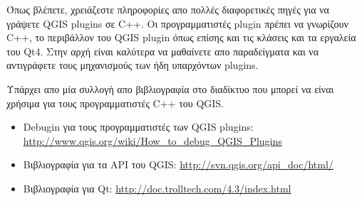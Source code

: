 Όπως βλέπετε, χρειάζεστε πληροφορίες απο πολλές διαφορετικές πηγές για να γράψετε QGIS plugins σε C++.  Οι προγραμματιστές plugin πρέπει να γνωρίζουν C++, το περιβάλλον του QGIS plugin όπως επίσης και τις κλάσεις και τα εργαλεία του Qt4. Στην αρχή είναι καλύτερα να μαθαίνετε απο παραδείγματα και να αντιγράφετε τους μηχανισμούς των ήδη υπαρχόντων plugins.  

Υπάρχει απο μία συλλογή απο βιβλιογραφία στο διαδίκτυο που μπορεί να είναι χρήσιμα για τους προγραμματιστές C++ του QGIS.

\begin{itemize}
\item Debugin για τους προγραμματιστές των QGIS plugins: \url{http://www.qgis.org/wiki/How_to_debug_QGIS_Plugins}
\item Βιβλιογραφία για τα API του QGIS: \url{http://svn.qgis.org/api_doc/html/}
\item Βιβλιογραφία για Qt: \url{http://doc.trolltech.com/4.3/index.html}
\end{itemize}

